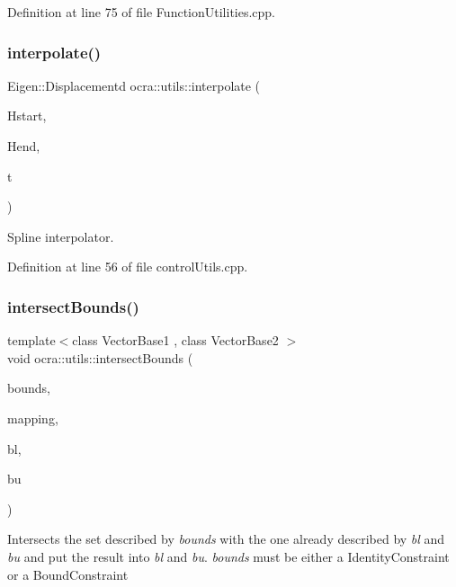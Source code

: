 Definition at line 75 of file Function\+Utilities.\+cpp.

\hypertarget{namespaceocra_1_1utils_a8d939e7ed429dffde760d84e41258940}{}\label{namespaceocra_1_1utils_a8d939e7ed429dffde760d84e41258940} 
\subsubsection{\texorpdfstring{interpolate()}{interpolate()}}
{\footnotesize\ttfamily Eigen\+::\+Displacementd ocra\+::utils\+::interpolate (\begin{DoxyParamCaption}\item[{const Eigen\+::\+Displacementd \&}]{Hstart,  }\item[{const Eigen\+::\+Displacementd \&}]{Hend,  }\item[{double}]{t }\end{DoxyParamCaption})}

Spline interpolator. 

Definition at line 56 of file control\+Utils.\+cpp.

\hypertarget{namespaceocra_1_1utils_aa835270370ca3a7f7b9e2858ef37dae0}{}\label{namespaceocra_1_1utils_aa835270370ca3a7f7b9e2858ef37dae0} 
\subsubsection{\texorpdfstring{intersect\+Bounds()}{intersectBounds()}}
{\footnotesize\ttfamily template$<$class Vector\+Base1 , class Vector\+Base2 $>$ \\
void ocra\+::utils\+::intersect\+Bounds (\begin{DoxyParamCaption}\item[{const \hyperlink{namespaceocra_ab310e2c53f5e52ec3aba0a832f7dc79e}{Diagonal\+Linear\+Constraint} \&}]{bounds,  }\item[{const std\+::vector$<$ int $>$ \&}]{mapping,  }\item[{Vector\+Base1 \&}]{bl,  }\item[{Vector\+Base2 \&}]{bu }\end{DoxyParamCaption})\hspace{0.3cm}{\ttfamily [inline]}}

Intersects the set described by {\itshape bounds} with the one already described by {\itshape bl} and {\itshape bu} and put the result into {\itshape bl} and {\itshape bu}. {\itshape bounds} must be either a Identity\+Constraint or a Bound\+Constraint 

